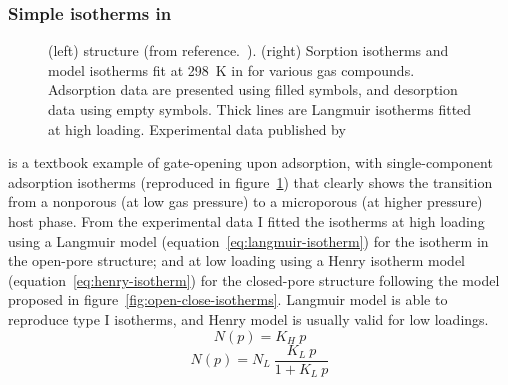 \documentclass[thesis]{subfiles}
\begin{document}
\subsubsection{Simple isotherms in \Cudhbc}

\begin{figure}[htp]
    \centering
    \hfill
    \raisebox{-0.5\height}{}
    \caption{(left) \Cudhbc structure (from reference.~\cite{Kitaura2003}). (right)
    Sorption isotherms and model isotherms fit at \SI{298}{K} in \Cudhbc for
    various gas compounds. Adsorption data are presented using filled symbols,
    and desorption data using empty symbols. Thick lines are Langmuir isotherms
    fitted at high loading. Experimental data published by
    \citeauthor{Kitaura2003}\cite{Kitaura2003}}
    \label{fig:cu-dhbc}
\end{figure}

\Cudhbc is a textbook example of gate-opening upon adsorption, with
single-component adsorption isotherms (reproduced in figure~\ref{fig:cu-dhbc})
that clearly shows the transition from a nonporous (at low gas pressure) to a
microporous (at higher pressure) host phase. From the experimental
data\cite{Kitaura2003} I fitted the isotherms at high loading using a Langmuir
model (equation~\eqref{eq:langmuir-isotherm}) for the isotherm in the open-pore
structure; and at low loading using a Henry isotherm model
(equation~\eqref{eq:henry-isotherm}) for the closed-pore structure following the
model proposed in figure~\ref{fig:open-close-isotherms}. Langmuir model is able
to reproduce type I isotherms, and Henry model is usually valid for low
loadings.
\[N(p) = K_H \ p \label{eq:henry-isotherm}\]
\[N(p) = N_L \ \frac{K_L \ p}{1 + K_L \ p} \label{eq:langmuir-isotherm}\]
\end{document}
